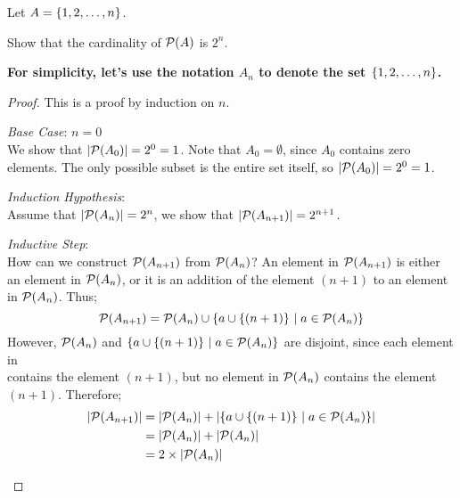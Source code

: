\begin{problem}
  Let $A = \left\{1, 2, \ldots, n\right\}$.
  \begin{enumalph}
    \item Show that the cardinality of $\mathcal{P}(A)$ is $2^n$.
      \begin{answer}
        \textbf{For simplicity, let's use the notation
        $A_n$ to denote the set $\left\{1, 2, \ldots, n\right\}$.}
        \begin{proof}
          This is a proof by induction on $n$.

          \begin{enumroman}
            \item \emph{Base Case}: $n = 0$\\
              We show that $\lvert\mathcal{P}(A_0)\rvert = 2^0 = 1$.
              Note that $A_0 = \emptyset$, since $A_0$ contains
              zero elements. The only possible subset is the entire set
              itself, so $\lvert\mathcal{P}(A_0)\rvert = 2^0 = 1$.
            \item \emph{Induction Hypothesis}: \\
              Assume that $\lvert\mathcal{P}(A_n)\rvert = 2^n$,
              we show that $\lvert\mathcal{P}(A_{n+1})\rvert = 2^{n+1}$.
            \item \emph{Inductive Step}:\\
              How can we construct $\mathcal{P}(A_{n+1})$ from $\mathcal{P}(A_n)$?
              An element in $\mathcal{P}(A_{n+1})$ is either an element in
              $\mathcal{P}(A_n)$, or it is an addition of the element $(n+1)$
              to an element in $\mathcal{P}(A_n)$. Thus; 
              \[
                \mathcal{P}(A_{n+1}) = \mathcal{P}(A_n) \cup \left\{a \cup \left\{(n+1)\right\}\, |\; a \in \mathcal{P}(A_n)\right\}
              \]
              However, $\mathcal{P}(A_n)$ and $\left\{a \cup \left\{(n+1)\right\}\, |\; a \in \mathcal{P}(A_n)\right\}$
              are disjoint, since each element in \\
               contains
              the element $(n+1)$, but no element in $\mathcal{P}(A_n)$ contains the element $(n+1)$.
              Therefore;
              \begin{align*}
                \abs{\calP(A_{n+1})} &= \abs{\calP(A_n)} + \abs{\set{a \cup \set{(n+1)}\, |\; a \in \calP(A_n)}} \\
                                                &= \abs{\calP(A_n)} + \abs{\calP(A_n)} \\
                                                &= 2 \times \abs{\calP(A_n)} \\

\end{align*}
\end{enumroman}
\end{proof}
\end{answer}
\end{enumalph}
\end{problem}
